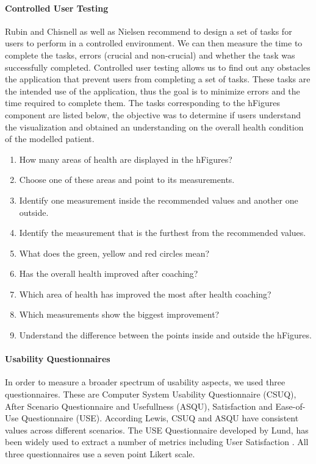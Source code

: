 \documentclass[twocolumn]{bmcart}%
\begin{document}
\paragraph*{Controlled User Testing}
Rubin and Chisnell \cite{rubin2008handbook} as well as Nielsen \cite{nielsen1994usability} recommend to design a set of tasks for users to perform in a controlled environment. We can then measure the time to complete the tasks, errors (crucial and non-crucial) and whether the task was successfully completed. Controlled user testing allows us to find out any obstacles the application that prevent users from completing a set of tasks. These tasks are the intended use of the application, thus the goal is to minimize errors and the time required to complete them. The tasks corresponding to the hFigures component are listed below, the objective was to determine if users understand the visualization and obtained an understanding on the overall health condition of the modelled patient.
\begin{enumerate}
\item How many areas of health are displayed in the hFigures?
\item Choose one of these areas and point to its measurements.
\item Identify one measurement inside the recommended values and another one outside.
\item Identify the measurement that is the furthest from the recommended values.
\item What does the green, yellow and red circles mean?
\item Has the overall health improved after coaching?
\item Which area of health has improved the most after health coaching?
\item Which measurements show the biggest improvement?
\item Understand the difference between the points inside and outside the hFigures.
\end{enumerate}

\paragraph*{Usability Questionnaires}
In order to measure a broader spectrum of usability aspects, we used three questionnaires. These are Computer System Usability Questionnaire (CSUQ), After Scenario Questionnaire and Usefullness (ASQU), Satisfaction and Ease-of-Use Questionnaire (USE). According Lewis, \cite{lewis1995ibm} CSUQ and ASQU have consistent values across different scenarios. The USE Questionnaire developed by Lund, has been widely used to extract a number of metrics including User Satisfaction \cite{Lund2001USE}. All three questionnaires use a seven point Likert scale.
\end{document}

